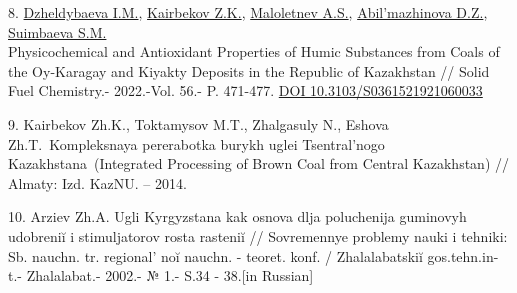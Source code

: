 \begin{references}
8.
\href{https://www.scopus.com/authid/detail.uri?authorId=56600659100}{Dzheldybaeva
I.M.},
\href{https://www.scopus.com/authid/detail.uri?authorId=55910705200}{Kairbekov
Z.K.},
\href{https://www.scopus.com/authid/detail.uri?authorId=7003481604}{Maloletnev
A.S.},
\href{https://www.scopus.com/authid/detail.uri?authorId=58021595400}{Abil'mazhinova
D.Z.},
\href{https://www.scopus.com/authid/detail.uri?authorId=57201691853}{Suimbaeva
S.M.} \\Physicochemical and Antioxidant Properties of Humic Substances
from Coals of the Oy-Karagay and Kiyakty Deposits in the Republic of
Kazakhstan // Solid Fuel Chemistry.- 2022.-Vol. 56.- P. 471-477.
\href{https://doi.org/10.3103/S0361521921060033}{DOI
10.3103/S0361521921060033}

9. Kairbekov Zh.K., Toktamysov M.T., Zhalgasuly N., Eshova
Zh.T.~Kompleksnaya pererabotka burykh uglei Tsentral'nogo
Kazakhstana~(Integrated Processing of Brown Coal from Central
Kazakhstan) // Almaty: Izd. KazNU. -- 2014.

10. Arziev Zh.A. Ugli Kyrgyzstana kak osnova dlja poluchenija guminovyh
udobreniĭ i stimuljatorov rosta rasteniĭ // Sovremennye problemy nauki i
tehniki: Sb. nauchn. tr. regional' noĭ nauchn. - teoret.
konf. / Zhalalabatskiĭ gos.tehn.in-t.- Zhalalabat.- 2002.- № 1.- S.34 -
38.{[}in Russian{]}
\end{references}

